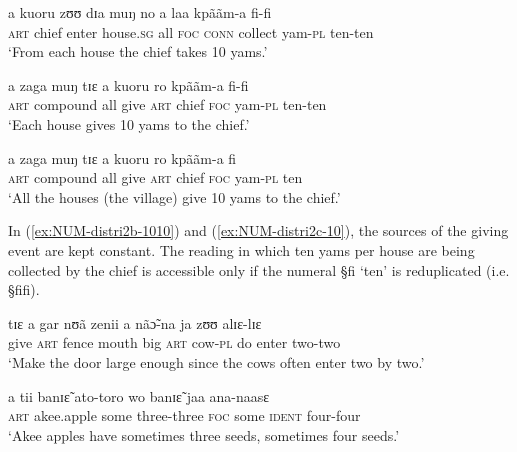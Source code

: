  
\begin{exe}
\ex\label{ex:NUM-distri2-10}
\begin{xlist}
 
\ex\label{ex:NUM-distri2a-1010}{\it }
\gll a kuoru  zʊʊ dɪa  muŋ  no  a laa kpããm-a fi-fi \\
  \textsc{art}  {chief}  {enter}  {house.\textsc{sg}}   {all}  \textsc{foc} 
\textsc{conn}  {collect}  {yam-\textsc{pl}}  {ten-ten}      \\
\glt  `From each house the chief takes 10 yams.'

\ex\label{ex:NUM-distri2b-1010}{\it }
\gll a  zaga  muŋ tɪɛ  a  kuoru ro  kpããm-a  fi-fi\\
  \textsc{art} {compound} {all} {give}  \textsc{art}  {chief}  \textsc{foc}
yam-\textsc{pl}  {ten-ten}      \\
\glt  `Each house gives 10 yams to the chief.'

\ex\label{ex:NUM-distri2c-10}{\it }
\gll a  zaga  muŋ tɪɛ  a   kuoru ro kpããm-a  fi \\
  \textsc{art} {compound} {all} {give}  \textsc{art}  {chief}  \textsc{foc}
yam-\textsc{pl}  ten     \\
\glt  `All the houses (the village) give 10 yams to the chief.'
\end{xlist}
\end{exe}


In (\ref{ex:NUM-distri2b-1010}) and (\ref{ex:NUM-distri2c-10}), the sources of
the giving event are kept constant. The reading in which
ten yams per house are being collected by the chief is accessible only
if the numeral {\S fi}  `ten' is reduplicated (i.e.  {\S fifi}).

\begin{exe}
\ex\label{ex:NUM-door-two-two}

 \gll  tɪɛ  a gar  nʊã zenii  a nãɔ̃-na  ja  zʊʊ  alɪɛ-lɪɛ\\
  {give}   \textsc{art}  {fence}  {mouth}   {big}  \textsc{art} 
{cow-\textsc{pl}}   {do} {enter} {two-two}       \\
\glt  `Make the door large enough since the cows often enter two by two.'\\

\end{exe}

\begin{exe}
\ex\label{ex:NUM-akee-apple-three-four}

 \gll  a tii banɪɛ̃ ato-toro  wo banɪɛ̃ jaa ana-naasɛ\\
 \textsc{art}  {akee.apple}  {some}   {three-three}  \textsc{foc}  {some}   
\textsc{ident} {four-four}   \\
\glt  `Akee apples have sometimes  three seeds, sometimes four seeds.'\\

\end{exe}



